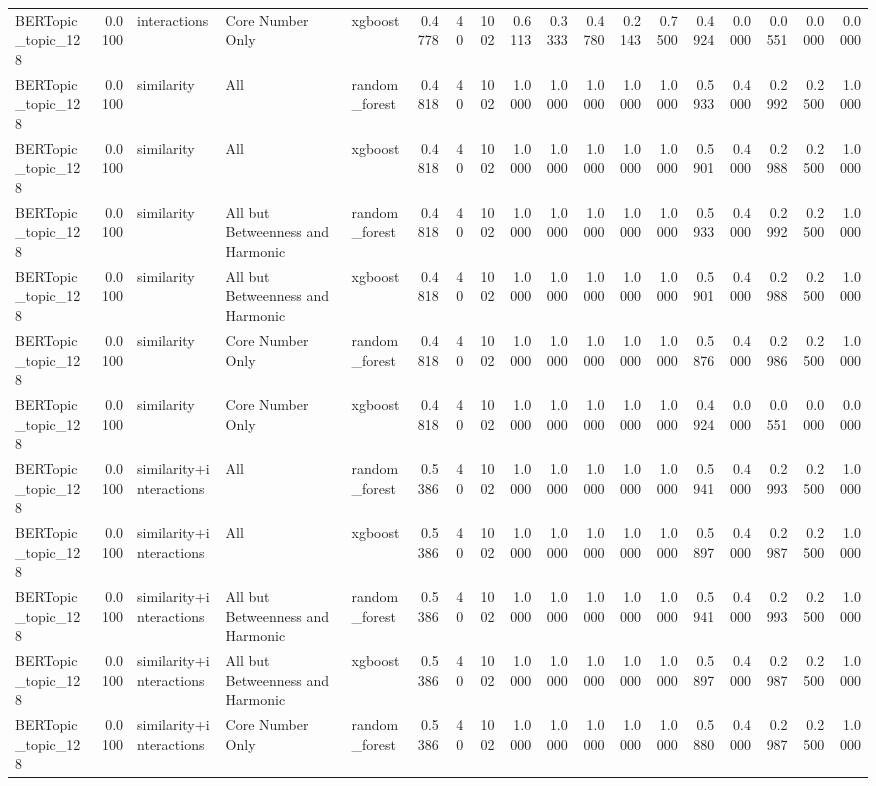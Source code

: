 \begin{tabular}{lrlllrrrrrrrrrrrrr}
BERTopic_topic_128 & 0.0100 & interactions & Core Number Only & xgboost & 0.4778 & 40 & 1002 & 0.6113 & 0.3333 & 0.4780 & 0.2143 & 0.7500 & 0.4924 & 0.0000 & 0.0551 & 0.0000 & 0.0000 \\
BERTopic_topic_128 & 0.0100 & similarity & All & random_forest & 0.4818 & 40 & 1002 & 1.0000 & 1.0000 & 1.0000 & 1.0000 & 1.0000 & 0.5933 & 0.4000 & 0.2992 & 0.2500 & 1.0000 \\
BERTopic_topic_128 & 0.0100 & similarity & All & xgboost & 0.4818 & 40 & 1002 & 1.0000 & 1.0000 & 1.0000 & 1.0000 & 1.0000 & 0.5901 & 0.4000 & 0.2988 & 0.2500 & 1.0000 \\
BERTopic_topic_128 & 0.0100 & similarity & All but Betweenness and Harmonic & random_forest & 0.4818 & 40 & 1002 & 1.0000 & 1.0000 & 1.0000 & 1.0000 & 1.0000 & 0.5933 & 0.4000 & 0.2992 & 0.2500 & 1.0000 \\
BERTopic_topic_128 & 0.0100 & similarity & All but Betweenness and Harmonic & xgboost & 0.4818 & 40 & 1002 & 1.0000 & 1.0000 & 1.0000 & 1.0000 & 1.0000 & 0.5901 & 0.4000 & 0.2988 & 0.2500 & 1.0000 \\
BERTopic_topic_128 & 0.0100 & similarity & Core Number Only & random_forest & 0.4818 & 40 & 1002 & 1.0000 & 1.0000 & 1.0000 & 1.0000 & 1.0000 & 0.5876 & 0.4000 & 0.2986 & 0.2500 & 1.0000 \\
BERTopic_topic_128 & 0.0100 & similarity & Core Number Only & xgboost & 0.4818 & 40 & 1002 & 1.0000 & 1.0000 & 1.0000 & 1.0000 & 1.0000 & 0.4924 & 0.0000 & 0.0551 & 0.0000 & 0.0000 \\
BERTopic_topic_128 & 0.0100 & similarity+interactions & All & random_forest & 0.5386 & 40 & 1002 & 1.0000 & 1.0000 & 1.0000 & 1.0000 & 1.0000 & 0.5941 & 0.4000 & 0.2993 & 0.2500 & 1.0000 \\
BERTopic_topic_128 & 0.0100 & similarity+interactions & All & xgboost & 0.5386 & 40 & 1002 & 1.0000 & 1.0000 & 1.0000 & 1.0000 & 1.0000 & 0.5897 & 0.4000 & 0.2987 & 0.2500 & 1.0000 \\
BERTopic_topic_128 & 0.0100 & similarity+interactions & All but Betweenness and Harmonic & random_forest & 0.5386 & 40 & 1002 & 1.0000 & 1.0000 & 1.0000 & 1.0000 & 1.0000 & 0.5941 & 0.4000 & 0.2993 & 0.2500 & 1.0000 \\
BERTopic_topic_128 & 0.0100 & similarity+interactions & All but Betweenness and Harmonic & xgboost & 0.5386 & 40 & 1002 & 1.0000 & 1.0000 & 1.0000 & 1.0000 & 1.0000 & 0.5897 & 0.4000 & 0.2987 & 0.2500 & 1.0000 \\
BERTopic_topic_128 & 0.0100 & similarity+interactions & Core Number Only & random_forest & 0.5386 & 40 & 1002 & 1.0000 & 1.0000 & 1.0000 & 1.0000 & 1.0000 & 0.5880 & 0.4000 & 0.2987 & 0.2500 & 1.0000 \\

\end{tabular}

